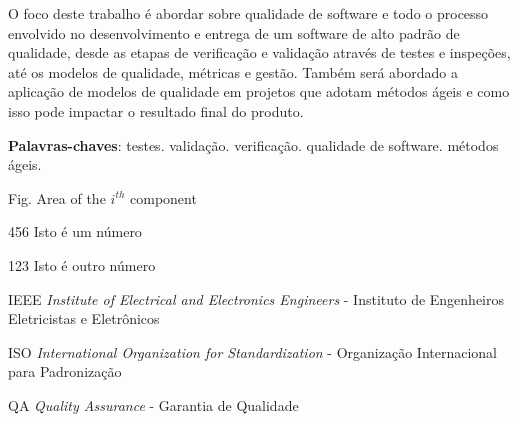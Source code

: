 \documentclass[
	12pt,				%
	openright,			%
	twoside,			%
	a4paper,			%
	english,			%
	brazil,				%
	]{abntex2}
\begin{document}
\frenchspacing 


\imprimircapa

\imprimirfolhaderosto


\begin{resumo}
 O foco deste trabalho é abordar sobre qualidade de software
 e todo o processo envolvido no desenvolvimento e entrega de
 um software de alto padrão de qualidade, desde as etapas de
 verificação e validação através de testes e inspeções, até 
 os modelos de qualidade, métricas e gestão. Também será
 abordado a aplicação de modelos de qualidade em projetos 
 que adotam métodos ágeis e como isso pode impactar o resultado
 final do produto.

 \vspace{\onelineskip}
    
 \noindent
 \textbf{Palavras-chaves}: testes. validação. verificação.
 qualidade de software. métodos ágeis.
\end{resumo}

\listoffigures*
\cleardoublepage

\listoftables*
\cleardoublepage

\begin{siglas}
    \item[Fig.] Area of the $i^{th}$ component
    \item[456] Isto é um número
    \item[123] Isto é outro número
    \item[IEEE] \emph{Institute of Electrical and Electronics Engineers} - Instituto de Engenheiros Eletricistas e Eletrônicos
    \item[ISO] \emph{International Organization for Standardization} - Organização Internacional para Padronização
    \item[QA] \emph{Quality Assurance} - Garantia de Qualidade
\end{siglas}
\end{document}

